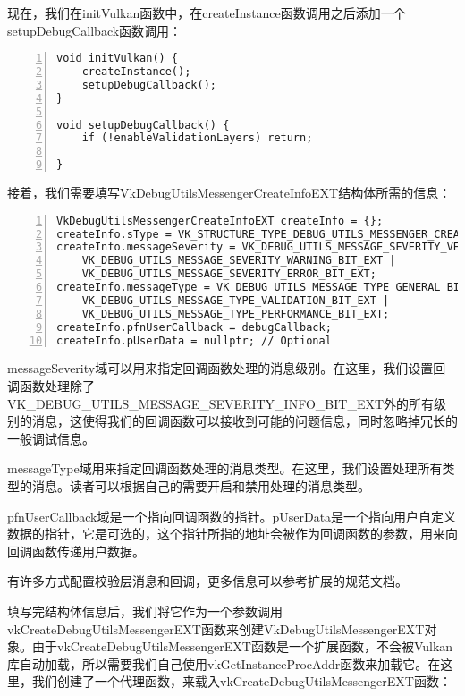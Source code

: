 \documentclass{ctexart}
\begin{document}
现在，我们在initVulkan函数中，在createInstance函数调用之后添加一个setupDebugCallback函数调用：

\begin{lstlisting}[language={[ANSI]C},keywordstyle=\color{blue!70},commentstyle=\color{red!50!green!50!blue!50},frame=shadowbox, rulesepcolor=\color{red!20!green!20!blue!20},basicstyle=\small,numbers=left, numberstyle=\tiny,breaklines=true]
void initVulkan() {
	createInstance();
	setupDebugCallback();
}

void setupDebugCallback() {
	if (!enableValidationLayers) return;

}
\end{lstlisting}

接着，我们需要填写VkDebugUtilsMessengerCreateInfoEXT结构体所需的信息：

\begin{lstlisting}[language={[ANSI]C},keywordstyle=\color{blue!70},commentstyle=\color{red!50!green!50!blue!50},frame=shadowbox, rulesepcolor=\color{red!20!green!20!blue!20},basicstyle=\small,numbers=left, numberstyle=\tiny,breaklines=true]
VkDebugUtilsMessengerCreateInfoEXT createInfo = {};
createInfo.sType = VK_STRUCTURE_TYPE_DEBUG_UTILS_MESSENGER_CREATE_INFO_EXT;
createInfo.messageSeverity = VK_DEBUG_UTILS_MESSAGE_SEVERITY_VERBOSE_BIT_EXT |
	VK_DEBUG_UTILS_MESSAGE_SEVERITY_WARNING_BIT_EXT |
	VK_DEBUG_UTILS_MESSAGE_SEVERITY_ERROR_BIT_EXT;
createInfo.messageType = VK_DEBUG_UTILS_MESSAGE_TYPE_GENERAL_BIT_EXT |
	VK_DEBUG_UTILS_MESSAGE_TYPE_VALIDATION_BIT_EXT |
	VK_DEBUG_UTILS_MESSAGE_TYPE_PERFORMANCE_BIT_EXT;
createInfo.pfnUserCallback = debugCallback;
createInfo.pUserData = nullptr; // Optional
\end{lstlisting}

messageSeverity域可以用来指定回调函数处理的消息级别。在这里，我们设置回调函数处理除了VK\_DEBUG\_UTILS\_MESSAGE\_SEVERITY\_INFO\_BIT\_EXT外的所有级别的消息，这使得我们的回调函数可以接收到可能的问题信息，同时忽略掉冗长的一般调试信息。

messageType域用来指定回调函数处理的消息类型。在这里，我们设置处理所有类型的消息。读者可以根据自己的需要开启和禁用处理的消息类型。

pfnUserCallback域是一个指向回调函数的指针。pUserData是一个指向用户自定义数据的指针，它是可选的，这个指针所指的地址会被作为回调函数的参数，用来向回调函数传递用户数据。

有许多方式配置校验层消息和回调，更多信息可以参考扩展的规范文档。

填写完结构体信息后，我们将它作为一个参数调用vkCreateDebugUtilsMessengerEXT函数来创建VkDebugUtilsMessengerEXT对象。由于vkCreateDebugUtilsMessengerEXT函数是一个扩展函数，不会被Vulkan库自动加载，所以需要我们自己使用vkGetInstanceProcAddr函数来加载它。在这里，我们创建了一个代理函数，来载入vkCreateDebugUtilsMessengerEXT函数：
\end{document}
